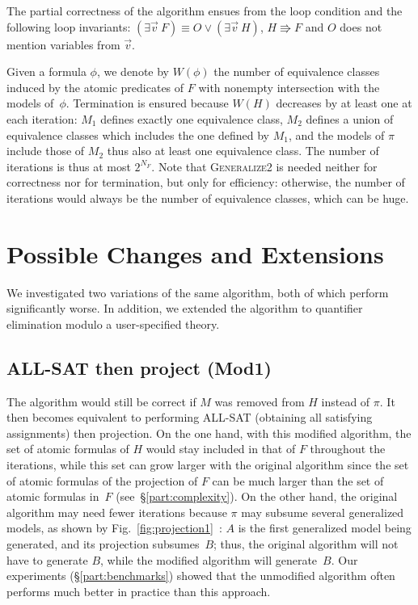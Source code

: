 The partial correctness of the algorithm ensues from the loop condition and the following loop invariants:
$(\exists \vec{v}~F) \equiv O \vee (\exists \vec{v}~H)$,
$H \Rrightarrow F$ and 
$O$ does not mention variables from $\vec{v}$.

Given a formula $\phi$, we denote by $W(\phi)$ the number of equivalence classes induced by the atomic predicates of $F$ with nonempty intersection with the models of~$\phi$. Termination is ensured because $W(H)$ decreases by at least one at each iteration: $M_1$ defines exactly one equivalence class, $M_2$ defines a union of equivalence classes which includes the one defined by $M_1$, and the models of $\pi$ include those of $M_2$ thus also at least one equivalence class. The number of iterations is thus at most $2^{N_F}$. Note that \textsc{Generalize2} is needed neither for correctness nor for termination, but only for efficiency: otherwise, the number of iterations would always be the number of equivalence classes, which can be huge.

\section{Possible Changes and Extensions}
We investigated two variations of the same algorithm, both of which perform significantly worse. In addition, we extended the algorithm to quantifier elimination modulo a user-specified theory.

\label{part:variants}

\subsection{ALL-SAT then project  (Mod1)}
\label{part:algo-mod1}
The algorithm would still be correct if $M$ was removed from $H$ instead of $\pi$. It then becomes equivalent to performing ALL-SAT (obtaining all satisfying assignments) then projection. On the one hand, with this modified algorithm, the set of atomic formulas of $H$ would stay included in that of $F$ throughout the iterations, while this set can grow larger with the original algorithm since the set of atomic formulas of the projection of $F$ can be much larger than the set of atomic formulas in~$F$ (see~\S\ref{part:complexity}). On the other hand, the original algorithm may need fewer iterations because $\pi$ may subsume several generalized models, as shown by Fig.~\ref{fig:projection1}~: $A$ is the first generalized model being generated, and its projection subsumes~$B$; thus, the original algorithm will not have to generate $B$, while the modified algorithm will generate~$B$. Our experiments (\S\ref{part:benchmarks}) showed that the unmodified algorithm often performs much better in practice than this approach.

